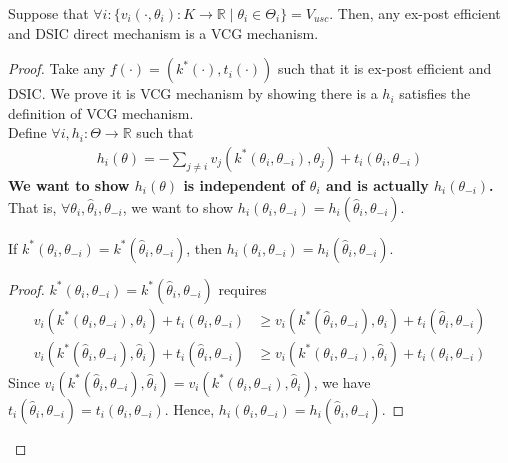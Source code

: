 \documentclass[11pt]{elegantbook_2}
\begin{document}
\begin{proposition}\label{prop:Uniq_VCG_mechanism}
    Suppose that $\forall i: \{v_i(\cdot,\theta_i): K \rightarrow \mathbb{R}\mid \theta_i\in\Theta_i\}=V_{usc}$. Then, any ex-post efficient and DSIC direct mechanism is a VCG mechanism.
\end{proposition}
\begin{proof}
    Take any $f(\cdot)=\left(k^*(\cdot),t_i(\cdot)\right)$ such that it is ex-post efficient and DSIC. We prove it is VCG mechanism by showing there is a $h_{i}$ satisfies the definition of VCG mechanism.\\
    Define $\forall i, h_i:\Theta \rightarrow \mathbb{R}$ such that
    \begin{equation}
        \begin{aligned}
            h_i(\theta)=-\sum_{j\neq i}v_j(k^*(\theta_i,\theta_{-i}),\theta_j)+t_i(\theta_i,\theta_{-i})
        \end{aligned}
        \nonumber
    \end{equation}
    \textbf{We want to show $h_i(\theta)$ is independent of $\theta_i$ and is actually $h_i(\theta_{-i})$.}\\
    That is, $\forall \theta_i,\hat{\theta}_i,\theta_{-i}$, we want to show $h_i(\theta_i,\theta_{-i})=h_i(\hat{\theta}_i,\theta_{-i})$.
    \begin{lemma}\label{lemma:k_h}
        If $k^*(\theta_i,\theta_{-i})=k^*(\hat{\theta}_i,\theta_{-i})$, then $h_i(\theta_i,\theta_{-i})=h_i(\hat{\theta}_i,\theta_{-i})$.
    \end{lemma}
    \begin{proof}
        $k^*(\theta_i,\theta_{-i})=k^*(\hat{\theta}_i,\theta_{-i})$ requires
        \begin{equation}
            \begin{aligned}
                v_i(k^*(\theta_i,\theta_{-i}),\theta_i)+t_i(\theta_i,\theta_{-i})&\geq v_i(k^*(\hat{\theta}_i,\theta_{-i}),\theta_i)+t_i(\hat{\theta}_i,\theta_{-i})\\
                v_i(k^*(\hat{\theta}_i,\theta_{-i}),\hat{\theta}_i)+t_i(\hat{\theta}_i,\theta_{-i})&\geq v_i(k^*(\theta_i,\theta_{-i}),\hat{\theta}_i)+t_i(\theta_i,\theta_{-i})
            \end{aligned}
            \nonumber
        \end{equation}
        Since $v_i(k^*(\hat{\theta}_i,\theta_{-i}),\hat{\theta}_i)=v_i(k^*(\theta_i,\theta_{-i}),\hat{\theta}_i)$, we have $t_i(\hat{\theta}_i,\theta_{-i})=t_i(\theta_i,\theta_{-i})$. Hence, $h_i(\theta_i,\theta_{-i})=h_i(\hat{\theta}_i,\theta_{-i})$.

\end{proof}
\end{proof}
\end{document}
